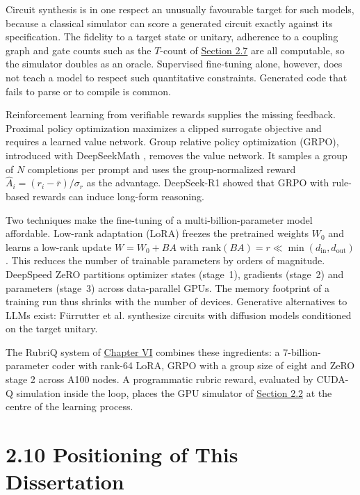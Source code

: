 \documentclass{report}
\theoremstyle{plain}
\theoremstyle{definition}
\theoremstyle{remark}
\begin{document}
Circuit synthesis is in one respect an unusually favourable target for such models, because a classical simulator can score a generated circuit exactly against its specification. The fidelity to a target state or unitary, adherence to a coupling graph and gate counts such as the $T$-count of \hyperref[sec:bg:qec]{Section 2.7} are all computable, so the simulator doubles as an oracle. Supervised fine-tuning alone, however, does not teach a model to respect such quantitative constraints. Generated code that fails to parse or to compile is common.

Reinforcement learning from verifiable rewards supplies the missing feedback. Proximal policy optimization \cite{schulman2017ppo} maximizes a clipped surrogate objective and requires a learned value network. Group relative policy optimization (GRPO), introduced with DeepSeekMath \cite{shao2024deepseekmath}, removes the value network. It samples a group of $N$ completions per prompt and uses the group-normalized reward $\hat{A}_i=(r_i-\bar{r})/\sigma_r$ as the advantage. DeepSeek-R1 \cite{deepseek2025r1} showed that GRPO with rule-based rewards can induce long-form reasoning.

Two techniques make the fine-tuning of a multi-billion-parameter model affordable. Low-rank adaptation (LoRA) \cite{hu2022lora} freezes the pretrained weights $W_0$ and learns a low-rank update $W=W_0+BA$ with $\mathrm{rank}(BA)=r\ll\min(d_{\mathrm{in}},d_{\mathrm{out}})$. This reduces the number of trainable parameters by orders of magnitude. DeepSpeed ZeRO \cite{rajbhandari2020zero} partitions optimizer states (stage~1), gradients (stage~2) and parameters (stage~3) across data-parallel GPUs. The memory footprint of a training run thus shrinks with the number of devices. Generative alternatives to LLMs exist: F{\"u}rrutter et al. \cite{furrutter2024genqc} synthesize circuits with diffusion models conditioned on the target unitary.

The RubriQ system of \hyperref[ch:synthesis]{Chapter VI} \cite{guo2026rubriq} combines these ingredients: a 7-billion-parameter coder with rank-64 LoRA, GRPO with a group size of eight and ZeRO stage 2 across A100 nodes. A programmatic rubric reward, evaluated by CUDA-Q simulation inside the loop, places the GPU simulator of \hyperref[sec:bg:sim]{Section 2.2} at the centre of the learning process.

\section{2.10 Positioning of This Dissertation}\label{sec:bg:summary}
\end{document}

